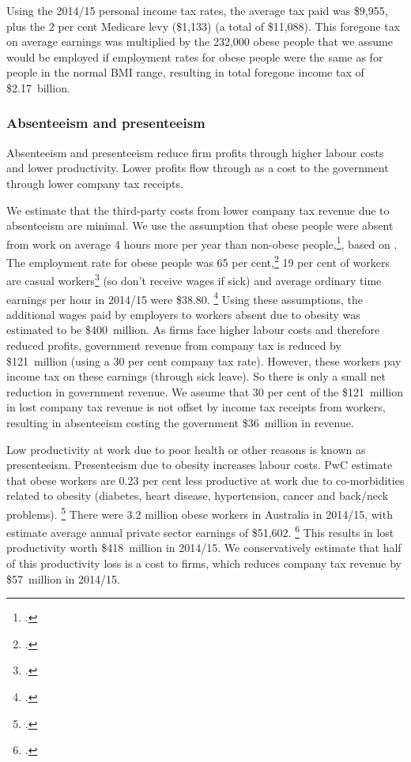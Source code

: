 \documentclass[embargoed]{grattan}
\begin{document}
Using the 2014/15 personal income tax rates, the average tax paid was \$9,955, plus the 2 per cent Medicare levy (\$1,133) (a total of \$11,088).
This foregone tax on average earnings was multiplied by the 232,000 obese people that we assume would be employed if employment rates for obese people were the same as for people in the normal BMI range, resulting in total foregone income tax of \$2.17~billion.

\subsubsection{Absenteeism and presenteeism}

Absenteeism and presenteeism reduce firm profits through higher labour costs and lower productivity.
Lower profits flow through as a cost to the government through lower company tax receipts.

We estimate that the third-party costs from lower company tax revenue due to absenteeism are minimal.
We use the assumption that obese people were absent from work on average 4 hours more per year than non-obese people,\footcite[][55]{PwC2015Weighingcostobesity}, based on \textcite{ABS20134364055002AustralianHealth}.
The employment rate for obese people was 65 per cent,\footcite{ABS2013436405503AustralianHealth} 19 per cent of workers are casual workers\footcite{ABS201563333} (so don't receive wages if sick) and average ordinary time earnings per hour in 2014/15 were \$38.80.%
\footcite{ABS201663020AverageWeekly} Using these assumptions, the additional wages paid by employers to workers absent due to obesity was estimated to be \$400~million.
As firms face higher labour costs and therefore reduced profits, government revenue from company tax is reduced by \$121~million (using a 30 per cent company tax rate).
However, these workers pay income tax on these earnings (through sick leave).
So there is only a small net reduction in government revenue.
We assume that 30 per cent of the \$121~million in lost company tax revenue is not offset by income tax receipts from workers, resulting in absenteeism costing the government \$36~million in revenue.

Low productivity at work due to poor health or other reasons is known as presenteeism.
Presenteeism due to obesity increases labour costs.
PwC estimate that obese workers are 0.23 per cent less productive at work due to co-morbidities related to obesity (diabetes, heart disease, hypertension, cancer and back/neck problems).%
\footcite[][56]{PwC2015Weighingcostobesity} There were 3.2 million obese workers in Australia in 2014/15, with estimate average annual private sector earnings of \$51,602.%
\footcite{ABS201663020AverageWeekly} This results in lost productivity worth \$418~million in 2014/15.
We conservatively estimate that half of this productivity loss is a cost to firms, which reduces company tax revenue by \$57~million in 2014/15.
\end{document}
